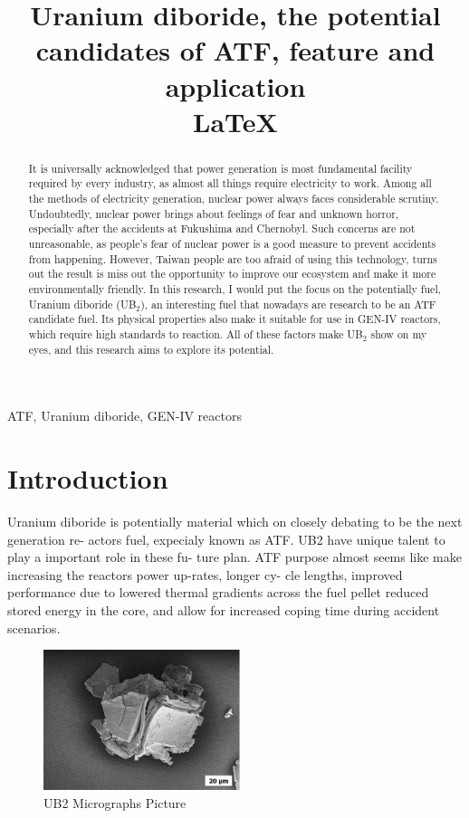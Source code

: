 \documentclass[final,11pt,times,twocolumn]{elsarticle}
\begin{document}
\begin{frontmatter}
\title{Uranium diboride, the potential candidates of ATF, feature and application \\ \LaTeX}
\begin{abstract}
It is universally acknowledged that power generation is most fundamental facility required by every industry, as almost all things require electricity to work. Among all the methods of electricity generation, nuclear power always faces considerable scrutiny. Undoubtedly, nuclear power brings about feelings of fear and unknown horror, especially after the accidents at Fukushima and Chernobyl. Such concerns are not unreasonable, as people's fear of nuclear power is a good measure to prevent accidents from happening. However, Taiwan people are too afraid of using this technology, turns out the result is miss out the opportunity to improve our ecosystem and make it more environmentally friendly. In this research, I would put the focus on the potentially fuel, Uranium diboride (UB$_{2}$), an interesting fuel that nowadays are research to be an ATF candidate fuel. Its physical properties also make it suitable for use in GEN-IV reactors, which require high standards to reaction. All of these factors make UB$_{2}$ show on my eyes, and this research aims to explore its potential.
\end{abstract}

\begin{keyword}
ATF, Uranium diboride, GEN-IV reactors
\end{keyword}

\end{frontmatter}

\section{Introduction}
Uranium diboride is potentially material which
on closely debating to be the next generation re-
actors fuel, expecialy known as ATF. UB2 have
unique talent to play a important role in these fu-
ture plan. ATF purpose almost seems like make
increasing the reactors power up-rates, longer cy-
cle lengths, improved performance due to lowered
thermal gradients across the fuel pellet reduced
stored energy in the core, and allow for increased
coping time during accident scenarios.

\begin{figure}[ht]
    \centering
    \includegraphics[width = 5.75cm]{UB2 Micrographs.png}
    \caption{UB2 Micrographs Picture}
\end{figure}
\end{document}
